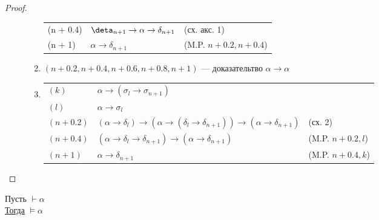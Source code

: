 \documentclass[english]{article}
\begin{document}
\begin{proof}
\begin{description}
\begin{enumerate}
\begin{center}
\begin{tabular}{l|ll}
						      (n + 0.4) & \(\deta_{n + 1} \to \alpha \to \delta_{n + 1}\) & (сх. акс. 1)                \\
						      (n + 1)   & \(\alpha \to \delta_{n + 1}\)                   & (M.P. \(n + 0.2, n + 0.4\)) \\
					      \end{tabular}
				      \end{center}
				\item \((n + 0.2, n + 0.4, n+0.6, n+0.8, n+1)\) --- доказательтво \(\alpha \to \alpha\)
				\item \-
				      \begin{center}
					      \begin{tabular}{lll}
						      \((k)\)       & \(\alpha \to (\sigma_l \to \sigma_{n + 1})\)                                                             &                       \\
						      \((l)\)       & \(\alpha \to \sigma_l\)                                                                                  &                       \\
						      \((n + 0.2)\) & \((\alpha \to \delta_l) \to (\alpha \to (\delta_l \to \delta_{n + 1})) \to (\alpha \to \delta_{n + 1})\) & (сх. 2)               \\
						      \((n + 0.4)\) & \((\alpha \to \delta_l \to \delta_{n + 1}) \to (\alpha \to \delta_{n + 1})\)                             & (M.P. \(n + 0.2, l\)) \\
						      \((n + 1)\)   & \(\alpha \to \delta_{n + 1}\)                                                                            & (M.P. \(n + 0.4, k\)) \\
					      \end{tabular}
				      \end{center}
			\end{enumerate}
	\end{description}
\end{proof}
\begin{theorem}[о корректности]
	Пусть \(\vdash \alpha\) \\
	\uline{Тогда} \(\vDash \alpha\)
	\label{orgf5765ea}
\end{theorem}
\end{document}
